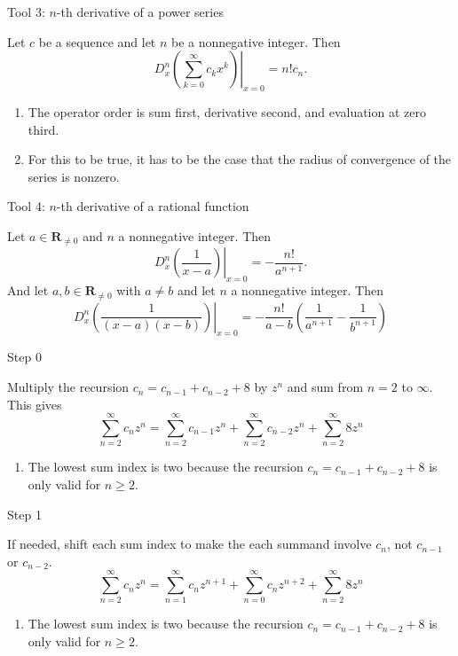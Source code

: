 \documentclass[portrait,fleqn,12pt]{beamer}
\newcommand{\reals}{\mathbf{R}}
\newenvironment{handlist}
   {\begin{enumerate}[\faHandPointRight]
       \addtolength{\itemsep}{0.0\itemsep}}
     {\end{enumerate}}
\begin{document}
\begin{frame}{Tool 3:  $n$-th derivative of a power series}

Let $c$ be a sequence and let $n$ be a nonnegative integer.  Then
\begin{equation}
      \left.  D^n_x \left( \sum_{k=0}^\infty c_k x^k  \right)  \right \vert_{x=0} = n!  c_n.
\end{equation}
\begin{handlist}
 \item The operator order is sum first, derivative second, and  evaluation at zero third.
   \item For this to be true, it has to be the case that  the radius of convergence of the series is nonzero.
\end{handlist}
\end{frame}

\begin{frame}{Tool 4:   $n$-th derivative of a rational function}

Let $a \in \reals_{\neq 0} $ and $n$ a nonnegative integer. Then
\begin{equation*}
      \left.  D^n_x \left(\frac{1}{x-a}  \right) \right \vert_{x=0} = -\frac{n!}{a^{n+1}}.
\end{equation*}
And let $a,b \in \reals_{\neq 0} $ with $a \neq b$  and let $n$ a nonnegative integer. Then
\begin{equation*}
      \left.  D^n_x \left(\frac{1}{(x-a)(x-b)}  \right) \right \vert_{x=0} = -\frac{n!}{a-b} \left(\frac{1}{a^{n+1}} - \frac{1}{b^{n+1}} \right)
\end{equation*}
\end{frame}

\begin{frame}{Step 0}

Multiply the recursion $c_n = c_{n-1} + c_{n-2}+ 8$ by $z^n$ and sum from $n=2$ to $\infty$.  This gives
\begin{equation}
  \sum_{n=2}^\infty c_{n} z^n  =  \sum_{n=2}^\infty c_{n-1} z^n +  \sum_{n=2}^\infty c_{n-2} z^n +  \sum_{n=2}^\infty 8 z^n
\end{equation}
\begin{handlist}
\item The lowest sum index is two because the recursion  $c_n = c_{n-1} + c_{n-2}+ 8$ is only valid for $n \geq 2$.
\end{handlist}
\end{frame}
\begin{frame}{Step 1}

If needed, shift each sum index to make the each summand involve $c_n$, not $c_{n-1}$ or $c_{n-2}$.
\begin{equation}
  \sum_{n=2}^\infty c_{n} z^n  =  \sum_{n=1}^\infty c_{n} z^{n+1} +  \sum_{n=0}^\infty c_{n} z^{n+2} +  \sum_{n=2}^\infty 8 z^n
\end{equation}
\begin{handlist}
\item The lowest sum index is two because the recursion  $c_n = c_{n-1} + c_{n-2}+ 8$ is only valid for $n \geq 2$.
\end{handlist}
\end{frame}
\end{document}
